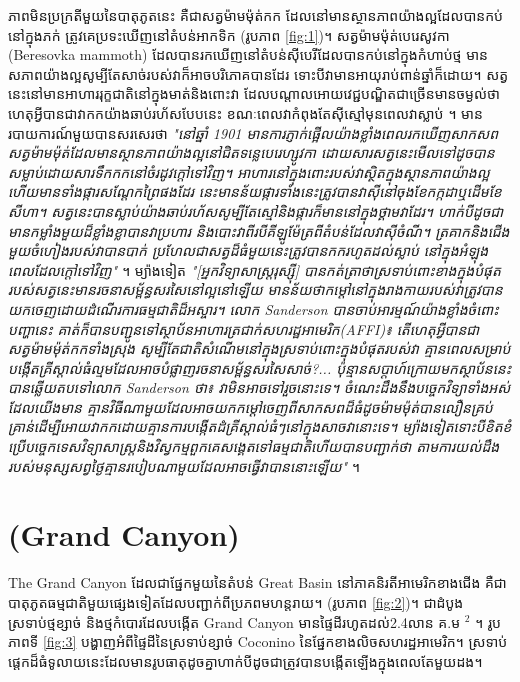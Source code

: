 \documentclass[10pt,twocolumn,letterpaper]{article}
\begin{document}
ភាពមិនប្រក្រតីមួយនៃបាតុភូតនេះ គឺជាសត្វម៉ាមម៉ុត់កក ដែលនៅមានស្ថានភាពយ៉ាងល្អដែលបានកប់នៅក្នុងភក់ ត្រូវគេប្រទះឃើញនៅតំបន់អាកទិក (រូបភាព \ref{fig:1})។ សត្វម៉ាមម៉ុត់បេរេសូវកា (Beresovka mammoth) ដែលបានរកឃើញនៅតំបន់ស៊ីបេរីដែលបានកប់នៅក្នុងកំហាប់ថ្ម មានសភាពយ៉ាងល្អសូម្បីតែសាច់របស់វាក៏អាចបរិភោគបានដែរ ទោះបីវាមានអាយុរាប់ពាន់ឆ្នាំក៏ដោយ។ សត្វនេះនៅមានអាហាររុក្ខជាតិនៅក្នុងមាត់និងពោះវា ដែលបណ្ដាលអោយវេជ្ជបណ្ឌិតជាច្រើនមានចម្ងល់ថា ហេតុអ្វីបានជាវាកកយ៉ាងឆាប់រហ័សបែបនេះ ខណៈពេលវាកំពុងតែសុីស្មៅមុនពេលវាស្លាប់ \cite{17}។ មានរបាយការណ៍មួយបានសរសេរថា \textit{"នៅឆ្នាំ 1901 មានការភ្ញាក់ផ្អើលយ៉ាងខ្លាំងពេលរកឃើញសាកសពសត្វម៉ាមម៉ុត់ដែលមានស្ថានភាពយ៉ាងល្អនៅជិតទន្លេបេរេហ្សូវកា ដោយសារសត្វនេះមើលទៅដូចបានសម្លាប់ដោយសារទឹកកកនៅចំរដូវក្តៅទៅវិញ។ អាហារនៅក្នុងពោះរបស់វាស្ថិតក្នុងស្ថានភាពយ៉ាងល្អ ហើយមានទាំងផ្ការសណ្តែកព្រៃផងដែរ នេះមានន័យផ្ការទាំងនេះត្រូវបានវាសុីនៅចុងខែកក្កដាឬដើមខែសីហា។ សត្វនេះបានស្លាប់យ៉ាងឆាប់រហ័សសូម្បីតែស្មៅនិងផ្ការក៏មាននៅក្នុងថ្គាមវាដែរ។ ហាក់បីដូចជាមានកម្លាំងមួយដ៏ខ្លាំងខ្លាបានវាប្រហារ និងបោះវាពីរបីគីឡូម៉ែត្រពីតំបន់ដែលវាសុីចំណី។ ត្រគាកនិងជើងមួយចំហៀងរបស់វាបានបាក់ ប្រហែលជាសត្វដ៏ធំមួយនេះត្រូវបានកករហូតដល់ស្លាប់ នៅក្នុងអំឡុងពេលដែលក្តៅទៅវិញ"} \cite{18}។ ម្យ៉ាងទៀត \textit{"[អ្នកវិទ្យាសាស្ត្ររុស្ស៊ី] បានកត់ត្រាថាស្រទាប់ពោះខាងក្នុងបំផុតរបស់សត្វនេះមានរចនាសម្ព័ន្ធសរសៃនៅល្អនៅឡើយ មានន័យថាកម្តៅនៅក្នុងរាងកាយរបស់វាត្រូវបានយកចេញដោយដំណើរការធម្មជាតិដ៏អស្ចារ។ លោក Sanderson បានចាប់អារម្មណ៍យ៉ាងខ្លាំងចំពោះបញ្ហានេះ គាត់ក៏បានបញ្ជូនទៅស្ថាប័នអាហារត្រជាក់សហរដ្ឋអាមេរិក(AFFI)៖ តើហេតុអ្វីបានជាសត្វម៉ាមម៉ុត់កកទាំងស្រុង សូម្បីតែជាតិសំណើមនៅក្នុងស្រទាប់ពោះក្នុងបំផុតរបស់វា គ្មានពេលសម្រាប់បង្កើតគ្រីស្តាល់ធំល្មមដែលអាចបំផ្លាញរចនាសម្ព័ន្ធសរសៃសាច់?... ប៉ុន្មានសប្តាហ៍ក្រោយមកស្ថាប័ននេះបានឆ្លើយតបទៅលោក Sanderson ថា៖ វាមិនអាចទៅរួចនោះទេ។ ចំណេះដឹងនឹងបច្ចេកវិទ្យាទាំងអស់ដែលយើងមាន គ្មានវិធីណាមួយដែលអាចយកកម្ដៅចេញពីសាកសពដ៏ធំដូចម៉ាមម៉ុត់បានលឿនគ្រប់គ្រាន់ដើម្បីអោយវាកកដោយគ្មានការបង្កើតដំគ្រីស្តាល់ធំៗនៅក្នុងសាចវានោះទេ។ ម្យ៉ាងទៀតទោះបីខិតខំប្រើបច្ចេកទេសវិទ្យាសាស្រ្តនិងវិស្វកម្មពួកគេសង្គេតទៅធម្មជាតិហើយបានបញ្ជាក់ថា តាមការយល់ដឹងរបស់មនុស្សសព្វថ្ងៃគ្មានរបៀបណាមួយដែលអាចធ្វើវាបាននោះឡើយ"} \cite{19}។

\section{ (Grand Canyon)}

The Grand Canyon ដែលជាផ្នែកមួយនៃតំបន់ Great Basin នៅភាគនិរតីអាមេរិកខាងជើង គឺជាបាតុភូតធម្មជាតិមួយផ្សេងទៀតដែលបញ្ជាក់ពីប្រភពមហន្តរាយ។ (រូបភាព \ref{fig:2})។ ជាដំបូង ស្រទាប់ថ្មខ្សាច់ និងថ្មកំបោរដែលបង្កើត Grand Canyon មានផ្ទៃដីរហូតដល់2.4លាន គ.ម $^2$ \cite{21}។ រូបភាពទី \ref{fig:3} បង្ហាញអំពីផ្ទៃដីនៃស្រទាប់ខ្សាច់ Coconino នៃផ្នែកខាងលិចសហរដ្ឋអាមេរិក។ ស្រទាប់ផ្តេកដ៏ធំទូលាយនេះដែលមានរូបធាតុដូចគ្នាហាក់បីដូចជាត្រូវបានបង្កើតឡើងក្នុងពេលតែមួយដង។
\end{document}
